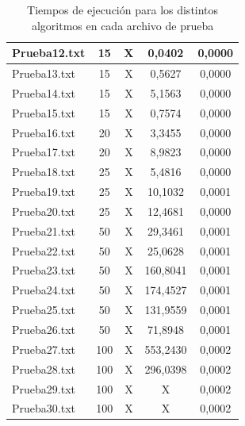 \documentclass[11pt,letter]{article}
\begin{document}
\begin{table}[H]
\begin{adjustbox}{width=\textwidth}
\begin{tabular}{|l|c|c|c|c|}
\hline
Prueba12.txt & 15 & \cellcolor{rosado}X & \cellcolor{verde}0,0402 & \cellcolor{verde}0,0000 \\
\hline
Prueba13.txt & 15 & \cellcolor{rosado}X & \cellcolor{verde}0,5627 & \cellcolor{verde}0,0000 \\
\hline
Prueba14.txt & 15 & \cellcolor{rosado}X & \cellcolor{verde}5,1563 & \cellcolor{verde}0,0000 \\
\hline
Prueba15.txt & 15 & \cellcolor{rosado}X & \cellcolor{verde}0,7574 & \cellcolor{verde}0,0000 \\
\hline
Prueba16.txt & 20 & \cellcolor{rosado}X & \cellcolor{verde}3,3455 & \cellcolor{verde}0,0000 \\
\hline
Prueba17.txt & 20 & \cellcolor{rosado}X & \cellcolor{verde}8,9823 & \cellcolor{verde}0,0000 \\
\hline
Prueba18.txt & 25 & \cellcolor{rosado}X & \cellcolor{verde}5,4816 & \cellcolor{verde}0,0000 \\
\hline
Prueba19.txt & 25 & \cellcolor{rosado}X & \cellcolor{verde}10,1032 & \cellcolor{verde}0,0001 \\
\hline
Prueba20.txt & 25 & \cellcolor{rosado}X & \cellcolor{verde}12,4681 & \cellcolor{verde}0,0000 \\
\hline
Prueba21.txt & 50 & \cellcolor{rosado}X & \cellcolor{verde}29,3461 & \cellcolor{verde}0,0001 \\
\hline
Prueba22.txt & 50 & \cellcolor{rosado}X & \cellcolor{verde}25,0628 & \cellcolor{verde}0,0001 \\
\hline
Prueba23.txt & 50 & \cellcolor{rosado}X & \cellcolor{verde}160,8041 & \cellcolor{verde}0,0001 \\
\hline
Prueba24.txt & 50 & \cellcolor{rosado}X & \cellcolor{verde}174,4527 & \cellcolor{verde}0,0001 \\
\hline
Prueba25.txt & 50 & \cellcolor{rosado}X & \cellcolor{verde}131,9559 & \cellcolor{verde}0,0001 \\
\hline
Prueba26.txt & 50 & \cellcolor{rosado}X & \cellcolor{verde}71,8948 & \cellcolor{verde}0,0001 \\
\hline
Prueba27.txt & 100 & \cellcolor{rosado}X & \cellcolor{verde}553,2430 & \cellcolor{verde}0,0002 \\
\hline
Prueba28.txt & 100 & \cellcolor{rosado}X & \cellcolor{verde}296,0398 & \cellcolor{verde}0,0002 \\
\hline
Prueba29.txt & 100 & \cellcolor{rosado}X & \cellcolor{rosado}X & \cellcolor{verde}0,0002 \\
\hline
Prueba30.txt & 100 & \cellcolor{rosado}X & \cellcolor{rosado}X & \cellcolor{verde}0,0002 \\
\hline
\end{tabular}
\end{adjustbox}
\caption{Tiempos de ejecución para los distintos algoritmos en cada archivo de prueba}
\end{table}
\end{document}
